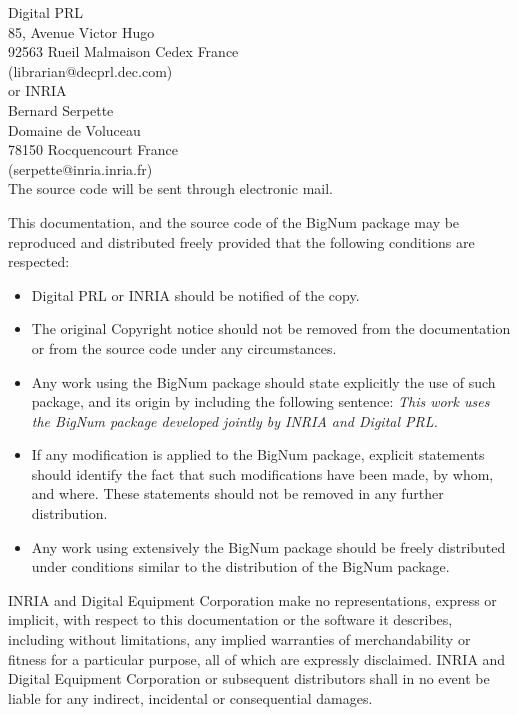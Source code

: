     Digital PRL\\			
    85, Avenue Victor Hugo\\ 
    92563 Rueil Malmaison Cedex  France\\         
    (librarian@decprl.dec.com) \\

 or INRIA\\			
    Bernard Serpette\\
    Domaine de Voluceau\\ 
    78150 Rocquencourt  France\\
    (serpette@inria.inria.fr)\\

  The source code will be sent through electronic mail.

This documentation, and the source code of the BigNum package may
be reproduced and distributed freely provided that the following
conditions are respected:
\begin{itemize}
   \item Digital PRL or INRIA should be notified of the copy.

   \item The original Copyright notice should not be removed from the
   documentation or from the source code under any circumstances.
 
   \item Any work using the BigNum package should state explicitly the use
   of such package, and its origin by including the following sentence:
   {\em This work uses the BigNum package developed jointly by INRIA and
   Digital PRL.}

   \item If any modification is applied to the BigNum package,
   explicit statements should identify the fact that such modifications
   have been made, by whom, and where. These statements should not be
   removed in any further distribution.
 
   \item Any work using extensively the BigNum package should be freely
   distributed under conditions similar to the distribution of the
   BigNum package.
\end{itemize}
INRIA and Digital Equipment Corporation make no representations, 
express or implicit, with
respect to this documentation or the software it describes, including
without limitations, any implied warranties of merchandability or
fitness for a particular purpose, all of which are expressly
disclaimed. INRIA and Digital Equipment Corporation  or subsequent distributors 
shall in no event
be liable for any indirect, incidental or consequential damages.

